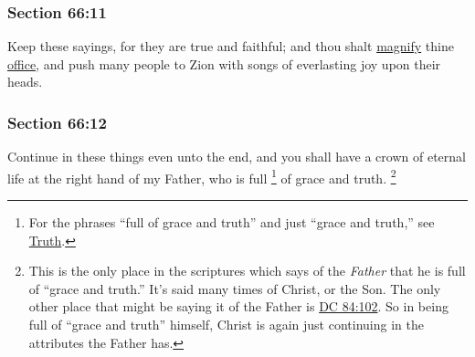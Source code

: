 
	\subsubsection{Section 66:11} %
		\label{DC66-11}

		Keep these sayings, for they are true and faithful; and thou shalt \hyperref[MAGNIFY]{magnify} thine \hyperref[OFFICE]{office}, and push many people to Zion with songs of everlasting joy upon their heads.


	\subsubsection{Section 66:12} %
		\label{DC66-12}

		Continue in these things even unto the end, and you shall have a crown of eternal life at the right hand of my Father, who is full%
			\footnote{%
				For the phrases ``full of grace and truth'' and just ``grace and truth,'' see \hyperref[TRUTH-PHRASES]{Truth}.
				}
		of grace and truth.%
			\footnote{%
				This is the only place in the scriptures which says of the \textit{Father} that he is full of ``grace and truth.'' It's said many times of Christ, or the Son. The only other place that might be saying it of the Father is \hyperref[DC84-102]{DC 84:102}. So in being full of ``grace and truth'' himself, Christ is again just continuing in the attributes the Father has.
				}


